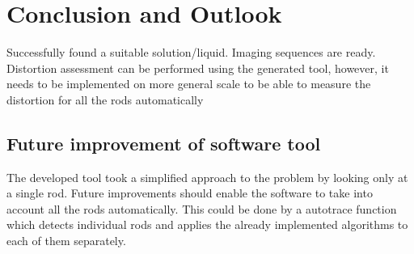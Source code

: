 
\chapter{Conclusion and Outlook}

Successfully found a suitable solution/liquid.
Imaging sequences are ready.
Distortion assessment can be performed using the generated tool, however, it needs to be implemented on more general scale to be able to measure the distortion for all the rods automatically
    
\section{Future improvement of software tool}

The developed tool took a simplified approach to the problem by looking only at a single rod.
Future improvements should enable the software to take into account all the rods automatically.
This could be done by a autotrace function which detects individual rods and applies the already implemented algorithms to each of them separately. 

